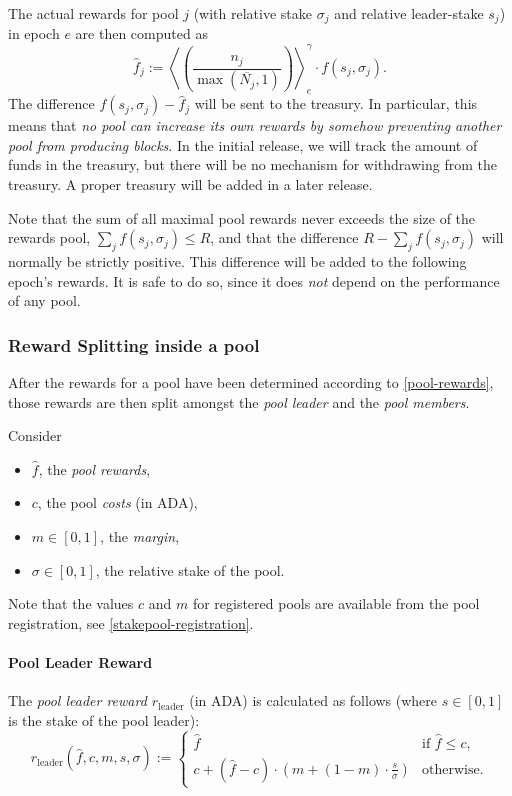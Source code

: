 \documentclass[11pt,a4paper]{article}
\newcommand*\ema[2]{\left\langle {#1} \right\rangle_{{#2}}}
\newcommand*\mean[1]{\overline{#1}}
\begin{document}
The actual rewards for pool \(j\) (with relative stake \(\sigma_j\) and relative
leader-stake \(s_j\)) in epoch \(e\) are then computed as
\[
    \hat{f}_j := \ema{\left(\frac{n_j}{\max(\mean{N_j}, 1)}\right)}{e}^\gamma\cdot f(s_j,\sigma_j).
\]
The difference \(f(s_j,\sigma_j)-\hat{f}_j\) will be sent to the
treasury. In particular, this means that \emph{no pool can increase its
own rewards by somehow preventing another pool from producing
blocks}. In the initial release, we will track the amount of funds in
the treasury, but there will be no mechanism for withdrawing from the
treasury. A proper treasury will be added in a later release.

Note that the sum of all maximal pool rewards never exceeds the size of the
rewards pool, \(\sum_jf(s_j,\sigma_j)\leq R\), and that the difference
\(R-\sum_jf(s_j,\sigma_j)\) will normally be strictly positive. This difference
will be added to the following epoch's rewards. It is safe to do so, since it
does \emph{not} depend on the performance of any pool.

\subsubsection{Reward Splitting inside a pool}
\label{reward-splitting-inside-a-pool}

After the rewards for a pool have been determined according to
\cref{pool-rewards}, those rewards are then split
amongst the \emph{pool leader} and the \emph{pool members}.

Consider

\begin{itemize}
\item
  \(\hat{f}\), the \emph{pool rewards},
\item
  \(c\), the pool \emph{costs} (in ADA),
\item
  \(m\in[0,1]\), the \emph{margin},
\item
  \(\sigma\in[0,1]\), the relative stake of the pool.
\end{itemize}

Note that the values \(c\) and \(m\) for registered pools are available
from the pool registration, see \cref{stakepool-registration}.

\paragraph{Pool Leader Reward}
\label{pool-leader-reward}

The \emph{pool leader reward \(r_\mathrm{leader}\)} (in ADA) is
calculated as follows (where \(s\in[0,1]\) is the stake of the pool
leader): \[
    r_\mathrm{leader}(\hat{f}, c, m, s, \sigma) :=
    \left\{
    \begin{array}{ll}
        \displaystyle\hat{f} &
        \text{if $\hat{f}\leq c$,} \\
        \displaystyle c + (\hat{f} - c)\cdot\left(m + (1-m)\cdot\frac{s}{\sigma}\right) &
        \text{otherwise.}
    \end{array}
    \right.
\]
\end{document}
